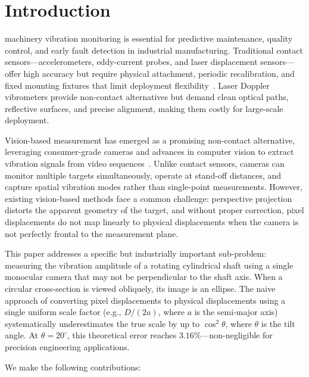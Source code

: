\documentclass[journal]{IEEEtran}
\begin{document}
\IEEEpeerreviewmaketitle

\section{Introduction}

 machinery vibration monitoring is essential for predictive
maintenance, quality control, and early fault detection in industrial manufacturing.
Traditional contact sensors---accelerometers, eddy-current probes, and laser
displacement sensors---offer high accuracy but require physical attachment,
periodic recalibration, and fixed mounting fixtures that limit deployment
flexibility~\cite{sabato2017}. Laser Doppler vibrometers provide non-contact
alternatives but demand clean optical paths, reflective surfaces, and precise
alignment, making them costly for large-scale deployment.

Vision-based measurement has emerged as a promising non-contact alternative,
leveraging consumer-grade cameras and advances in computer vision to extract
vibration signals from video sequences~\cite{feng2017}. Unlike contact sensors,
cameras can monitor multiple targets simultaneously, operate at stand-off
distances, and capture spatial vibration modes rather than single-point
measurements. However, existing vision-based methods face a common challenge:
perspective projection distorts the apparent geometry of the target, and without
proper correction, pixel displacements do not map linearly to physical displacements
when the camera is not perfectly frontal to the measurement plane.

This paper addresses a specific but industrially important sub-problem: measuring
the vibration amplitude of a rotating cylindrical shaft using a single monocular
camera that may not be perpendicular to the shaft axis. When a circular cross-section
is viewed obliquely, its image is an ellipse. The naive approach of converting
pixel displacements to physical displacements using a single uniform scale factor
(e.g., $D/(2a)$, where $a$ is the semi-major axis) systematically underestimates
the true scale by up to $\cos^{2}\theta$, where $\theta$ is the tilt angle.
At $\theta = 20^{\circ}$, this theoretical error reaches $3.16\%$---non-negligible
for precision engineering applications.

We make the following contributions:
\end{document}
